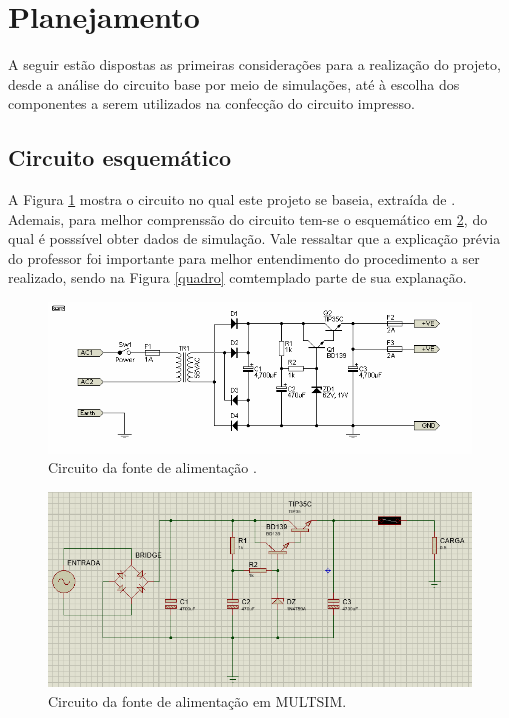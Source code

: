 \documentclass[a4paper,12pt,oneside,openany,table,xcdraw]{article}
\begin{document}

\newpage
\section{Planejamento} %
A seguir estão dispostas as primeiras considerações para a realização do projeto, desde a análise do circuito base por meio de simulações, até à escolha dos componentes a serem utilizados na confecção do circuito impresso.

\subsection{Circuito esquemático}
A Figura \ref{circuito} mostra o circuito no qual este projeto se baseia, extraída de \cite{amp}. Ademais, para melhor comprenssão do circuito tem-se o esquemático em \ref{sim1}, do qual é posssível obter dados de simulação. Vale ressaltar que a explicação prévia do professor foi importante para melhor entendimento do procedimento a ser realizado, sendo na Figura \ref{quadro} comtemplado parte de sua explanação.

\begin{figure}[H]
\centering
\captionsetup{font=scriptsize}
\includegraphics[width=16cm]{fonte}
\caption{Circuito da fonte de alimentação \cite{amp}.}
\label{circuito}
\end{figure}

\begin{figure}[H]
\centering
\captionsetup{font=scriptsize}
\includegraphics[width=16cm]{sim1}
\caption{Circuito da fonte de alimentação em MULTSIM.}
\label{sim1}
\end{figure}
\end{document}
